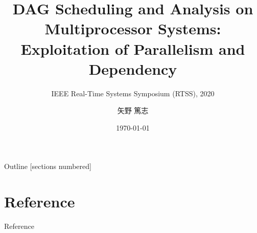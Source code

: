 \newcommand{\beamerDir}[0]{/mnt/c/Users/atsushi/Documents/workspace/env/Beamer/beamer/beamer/}







\title{DAG Scheduling and Analysis on Multiprocessor Systems: Exploitation of Parallelism and Dependency}
\subtitle{IEEE Real-Time Systems Symposium (RTSS), 2020}
\author{矢野 篤志}
\date{\today}




\maketitle



\begin{frame}{Outline}
    [sections numbered]
    \scriptsize\tableofcontents[hideallsubsections]
\end{frame}









\lastpage

\section*{Reference}
\begin{frame}[allowframebreaks]{Reference}
    \beamertemplatetextbibitems
    
    
\end{frame}


